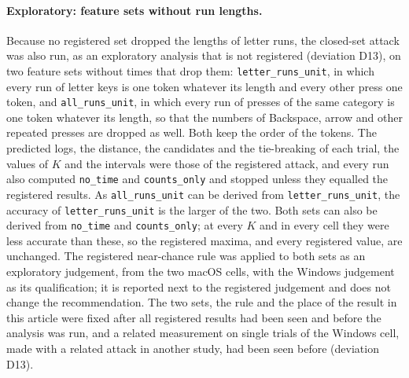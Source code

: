 \paragraph{Exploratory: feature sets without run lengths.} Because no registered set dropped the lengths of letter
runs, the closed-set attack was also run, as an exploratory analysis that is not registered (deviation D13), on two
feature sets without times that drop them: \texttt{letter\_runs\_unit}, in which every run of letter keys is one token
whatever its length and every other press one token, and \texttt{all\_runs\_unit}, in which every run of presses of the
same category is one token whatever its length, so that the numbers of Backspace, arrow and other repeated presses are
dropped as well. Both keep the order of the tokens. The predicted logs, the distance, the candidates and the
tie-breaking of each trial, the values of $K$ and the intervals were those of the registered attack, and every run also
computed \texttt{no\_time} and \texttt{counts\_only} and stopped unless they equalled the registered results. As
\texttt{all\_runs\_unit} can be derived from \texttt{letter\_runs\_unit}, the accuracy of \texttt{letter\_runs\_unit}
is the larger of the two. Both sets can also be derived from \texttt{no\_time} and \texttt{counts\_only}; at every $K$
and in every cell they were less accurate than these, so the registered maxima, and every registered value, are
unchanged. The registered near-chance rule was applied to both sets as an exploratory judgement, from
the two macOS cells, with the Windows judgement as its qualification; it is reported next to the registered judgement
and does not change the recommendation. The two sets, the rule and the place of the result in this article were fixed
after all registered results had been seen and before the analysis was run, and a related measurement on single trials
of the Windows cell, made with a related attack in another study, had been seen before (deviation D13).

